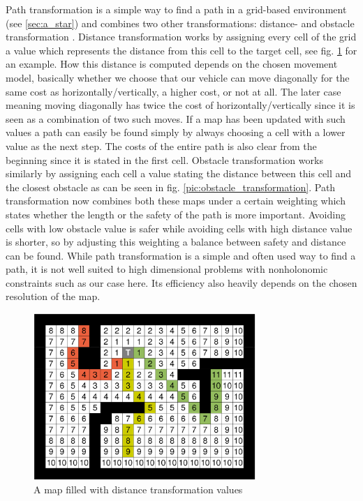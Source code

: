 Path transformation is a simple way to find a path in a grid-based environment (see \ref{sec:a_star}) and combines two other transformations: distance- and obstacle transformation \cite{35}. Distance transformation works by assigning every cell of the grid a value which represents the distance from this cell to the target cell, see fig. \ref{pic:distance_transformation} for an example. How this distance is computed depends on the chosen movement model, basically whether we choose that our vehicle can move diagonally for the same cost as horizontally/vertically, a higher cost, or not at all. The later case meaning moving diagonally has twice the cost of horizontally/vertically since it is seen as a combination of two such moves. If a map has been updated with such values a path can easily be found simply by always choosing a cell with a lower value as the next step. The costs of the entire path is also clear from the beginning since it is stated in the first cell. Obstacle transformation works similarly by assigning each cell a value stating the distance between this cell and the closest obstacle as can be seen in fig. \ref{pic:obstacle_transformation}. Path transformation now combines both these maps under a certain weighting which states whether the length or the safety of the path is more important. Avoiding cells with low obstacle value is safer while avoiding cells with high distance value is shorter, so by adjusting this weighting a balance between safety and distance can be found. 
While path transformation is a simple and often used way to find a path, it is not well suited to high dimensional problems with nonholonomic constraints such as our case here. Its efficiency also heavily depends on the chosen resolution of the map.

\begin{figure}[b]
\centering
\includegraphics[width=0.75\textwidth]{./Chapters/Figures/distance_transformation.png}
\caption{A map filled with distance transformation values\label{pic:distance_transformation}}
\end{figure}

